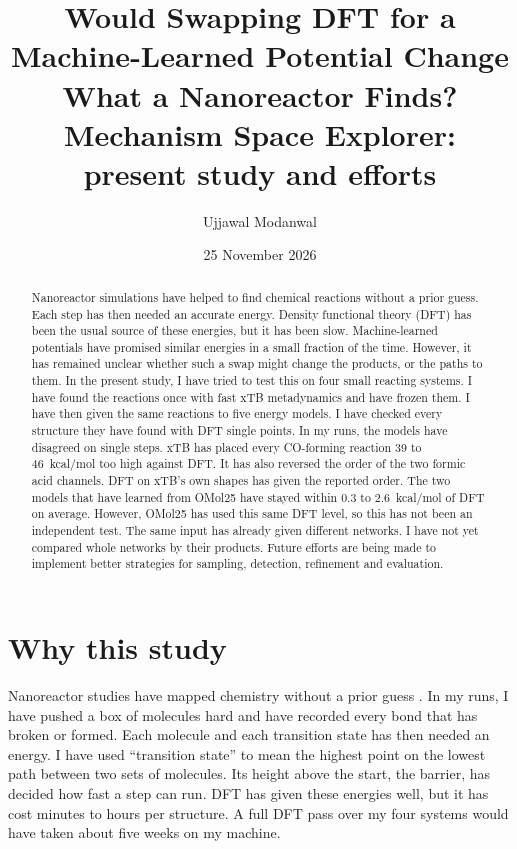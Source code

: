 \documentclass[11pt]{article}
\title{\vspace{-1.6cm}Would Swapping DFT for a Machine-Learned Potential
Change What a Nanoreactor Finds?\\[4pt]
\large Mechanism Space Explorer: present study and efforts}
\author{Ujjawal Modanwal}
\date{25 November 2026}
\newcommand{\kcal}{kcal/mol}
\begin{document}
\maketitle

\begin{abstract}
\noindent Nanoreactor simulations have helped to find chemical reactions
without a prior guess. Each step has then needed an accurate energy.
Density functional theory (DFT) has been the usual source of these
energies, but it has been slow. Machine-learned potentials have promised
similar energies in a small fraction of the time. However, it has remained
unclear whether such a swap might change the products, or the paths to
them. In the present study, I have tried to test this on four small
reacting systems. I have found the reactions once with fast xTB
metadynamics and have frozen them. I have then given the same reactions to
five energy models. I have checked every structure they have found with
DFT single points. In my runs, the models have disagreed on single steps.
xTB has placed every CO-forming reaction 39 to 46~\kcal{} too high against
DFT. It has also reversed the order of the two formic acid channels. DFT
on xTB's own shapes has given the reported order. The two models that have
learned from OMol25 have stayed within 0.3 to 2.6~\kcal{} of DFT on
average. However, OMol25 has used this same DFT level, so this has not
been an independent test. The same input has already given different
networks. I have not yet compared whole networks by their products.
Future efforts are being made to implement
better strategies for sampling, detection, refinement and evaluation.
\end{abstract}

\section{Why this study}

Nanoreactor studies have mapped chemistry without a prior guess
\cite{wang2014,grimme2019,zhang2023}. In my runs, I have pushed a box of
molecules hard and have recorded every bond that has broken or formed.
Each molecule and each transition state has then needed an energy. I have
used ``transition state'' to mean the highest point on the lowest path
between two sets of molecules. Its height above the start, the barrier,
has decided how fast a step can run. DFT has given these energies well,
but it has cost minutes to hours per structure. A full DFT pass over my
four systems would have taken about five weeks on my machine.
\end{document}
